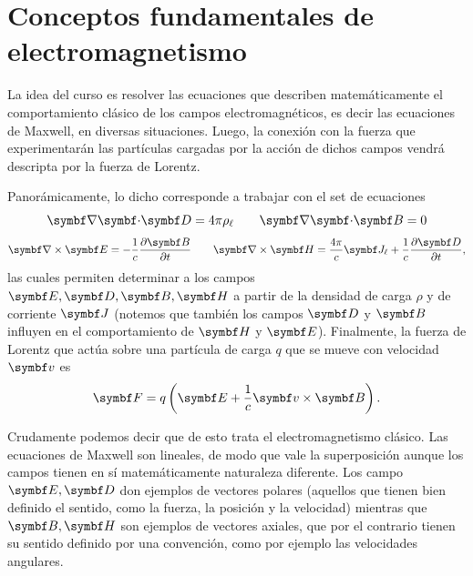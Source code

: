 \documentclass[10pt,oneside]{CBFT_book}
\begin{document}
\chapter{Conceptos fundamentales de electromagnetismo}



La idea del curso es resolver las ecuaciones que describen matemáticamente el comportamiento clásico 
de los campos electromagnéticos, es decir las ecuaciones de Maxwell, en diversas situaciones.
Luego, la conexión con la fuerza que experimentarán las partículas cargadas por la acción de dichos
campos vendrá descripta por la fuerza de Lorentz.

Panorámicamente, lo dicho corresponde a trabajar con el set de ecuaciones
\[
	\divem{D} = 4 \pi \rho_\ell \qquad \divem{B} = 0 
\]
\[
	\rotorm{E} = - \frac{1}{c} \dpar{\vb{B}}{t} 
	\qquad 
	\rotorm{H} = \frac{4\pi}{c} \vb{J}_\ell + \frac{1}{c}\dpar{\vb{D}}{t},
\]
las cuales permiten determinar a los campos $\vb{E}, \vb{D}, \vb{B}, \vb{H}$ a partir de la densidad 
de carga $\rho$ y de corriente $\vb{J}$ (notemos que también los campos $\vb{D}$ y $\vb{B}$ influyen
en el comportamiento de $\vb{H}$ y $\vb{E}$).
Finalmente, la fuerza de Lorentz que actúa sobre una partícula de carga $q$ que se mueve con velocidad
$\vb{v}$ es
\[
	\vb{F} = q \left( \vb{E} + \frac{1}{c} \pv{v}{B} \right).
\]

Crudamente podemos decir que de esto trata el electromagnetismo clásico.
Las ecuaciones de Maxwell son lineales, de modo que vale la superposición aunque los campos tienen en
sí matemáticamente naturaleza diferente.
Los campo $\vb{E}, \vb{D}$ don ejemplos de vectores polares (aquellos que tienen bien definido el sentido,
como la fuerza, la posición y la velocidad) mientras que $\vb{B}, \vb{H}$ son ejemplos de vectores axiales,
que por el contrario tienen su sentido definido por una convención, como por ejemplo las velocidades
angulares.

\end{document}

